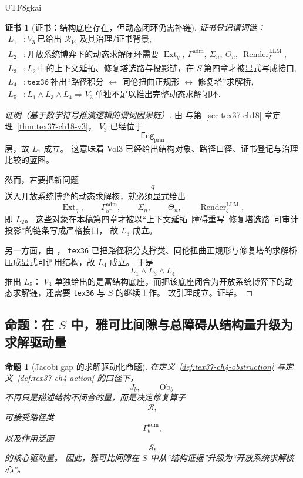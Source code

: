 \documentclass[12pt]{article}
\newtheorem{proposition}{命题}[section]
\newtheorem{Certificate}{证书}[section]
\newcommand{\Render}{\operatorname{Render}}
\begin{document}
\begin{CJK*}{UTF8}{gkai}
\begin{Certificate}[证书：结构底座存在，但动态闭环仍需补链]
\label{cert:tex37-ch19-static-vs-dynamic}
证书登记谓词链：
\[
\begin{aligned}
  L_1 &: V_3\ \text{已给出 }\mathcal R_{V_3}\ \text{及其治理/证书背景},\\
  L_2 &: \text{开放系统博弈下的动态求解闭环需要 }\operatorname{Ext}_q,\ \Gamma^{\mathrm{adm}},\ \Sigma_n,\ \Theta_n,\
    \Render^{\mathrm{LLM}}_\xi,\\
  L_3 &: L_2\ \text{中的上下文延拓、修复塔选路与投影链，在 }S\ \text{第四章才被显式写成接口},\\
  L_4 &: \texttt{tex36}\ \text{补出“路径积分 }\leftrightarrow\text{ 同伦扭曲正规形 }\leftrightarrow\text{ 修复塔”求解桥},\\
  L_5 &: L_1\wedge L_3\wedge L_4\Rightarrow V_3\ \text{单独不足以推出完整动态求解闭环}.
\end{aligned}
\]
\end{Certificate}

\begin{proof}[证明（基于数学符号推演逻辑的谓词因果链）]
由 \cite{GaoZhengAppVol3} 与第~\ref{sec:tex37-ch18} 章定理~\ref{thm:tex37-ch18-v3}，
$V_3$ 已经位于
\[
  \mathsf{Eng}_{\mathrm{prin}}
\]
层，故 $L_1$ 成立。
这意味着 Vol3 已经给出结构对象、路径口径、证书登记与治理比较的蓝图。

然而，若要把新问题
\[
  q
\]
送入开放系统博弈的动态求解核，就必须显式给出
\[
  \operatorname{Ext}_q,
  \qquad
  \Gamma_{b^+}^{\mathrm{adm}},
  \qquad
  \Sigma_n,
  \qquad
  \Theta_n,
  \qquad
  \Render^{\mathrm{LLM}}_\xi,
\]
即 $L_2$。
这些对象在本稿第四章才被以“上下文延拓--障碍重写--修复塔选路--可审计投影”的链条写成严格接口，
故 $L_3$ 成立。

另一方面，由 \cite{RepoTex36HomotopyTwistBijection,RepoTex35ExtendedCertificationTower}，
\texttt{tex36} 已把路径积分支撑类、同伦扭曲正规形与修复塔的求解桥压成显式可调用结构，故 $L_4$ 成立。
于是
\[
  L_1\wedge L_3\wedge L_4
\]
推出 $L_5$：
$V_3$ 单独给出的是富结构底座，而把该底座闭合为开放系统博弈下的动态求解链，还需要 \texttt{tex36} 与 $S$ 的继续工作。
故引理成立。证毕。
\end{proof}

\subsection{命题：在 $S$ 中，雅可比间隙与总障碍从结构量升级为求解驱动量}
\label{subsec:tex37-ch19-proposition}

\begin{proposition}[Jacobi gap 的求解驱动化命题]
\label{prop:tex37-ch19-jacobi-driver}
在定义~\ref{def:tex37-ch4-obstruction} 与定义~\ref{def:tex37-ch4-action} 的口径下，
\[
  J_b,
  \qquad
  \operatorname{Ob}_b
\]
不再只是描述结构不闭合的量，而是决定修复算子
\[
  \mathcal R,
\]
可接受路径类
\[
  \Gamma_b^{\mathrm{adm}},
\]
以及作用泛函
\[
  \mathcal S_b
\]
的核心驱动量。
因此，雅可比间隙在 $S$ 中从“结构证据”升级为“开放系统求解核心”。
\end{proposition}


\end{CJK*}
\end{document}
